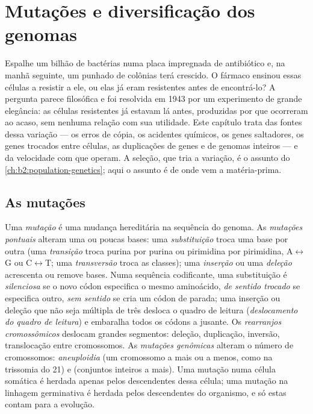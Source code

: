 \chapter{Mutações e diversificação dos genomas}\label{ch:b2:genome-diversification}

Espalhe um bilhão de bactérias numa placa impregnada de antibiótico e,
na manhã seguinte, um punhado de colônias terá crescido. O fármaco
ensinou essas células a resistir a ele, ou elas já eram resistentes
antes de encontrá-lo? A pergunta parece filosófica e foi resolvida em
1943 por um experimento de grande elegância: as células resistentes
já estavam lá antes, produzidas por  que ocorreram ao acaso,
sem nenhuma relação com sua utilidade. Este capítulo trata das fontes
dessa variação --- os erros de cópia, os acidentes químicos, os genes
saltadores, os genes trocados entre células, as duplicações de genes
e de genomas inteiros --- e da velocidade com que operam. A seleção,
que tria a variação, é o assunto do
\cref{ch:b2:population-genetics}; aqui o assunto é de onde vem a matéria-prima.

\section{As mutações}

\begin{definition}\label{def:b2:genome-diversification:mutation}
Uma \emph{mutação} é uma mudança hereditária na sequência do genoma.
As \emph{mutações pontuais} alteram uma ou poucas bases: uma
\emph{substituição} troca uma base por outra (uma \emph{transição}
troca purina por purina ou pirimidina por pirimidina,
A$\leftrightarrow$G ou C$\leftrightarrow$T; uma
\emph{transversão} troca as classes); uma \emph{inserção} ou uma
\emph{deleção} acrescenta ou remove bases. Numa sequência codificante,
uma substituição é \emph{silenciosa} se o novo códon especifica o
mesmo aminoácido, \emph{de sentido trocado} se especifica outro,
\emph{sem sentido} se cria um códon de parada; uma inserção ou deleção
que não seja múltipla de três desloca o quadro de leitura
(\emph{deslocamento do quadro de leitura}) e embaralha todos os códons
a jusante. Os \emph{rearranjos cromossômicos} deslocam grandes
segmentos: deleção, duplicação, inversão, translocação entre
cromossomos. As \emph{mutações genômicas} alteram o número de
cromossomos: \emph{aneuploidia} (um cromossomo a mais ou a menos, como
na trissomia do 21) e \emph{} (conjuntos inteiros a mais).
Uma mutação numa célula somática é herdada apenas pelos descendentes
dessa célula; uma mutação na linhagem germinativa é herdada pelos
descendentes do organismo, e só estas contam para a evolução.
\end{definition}

